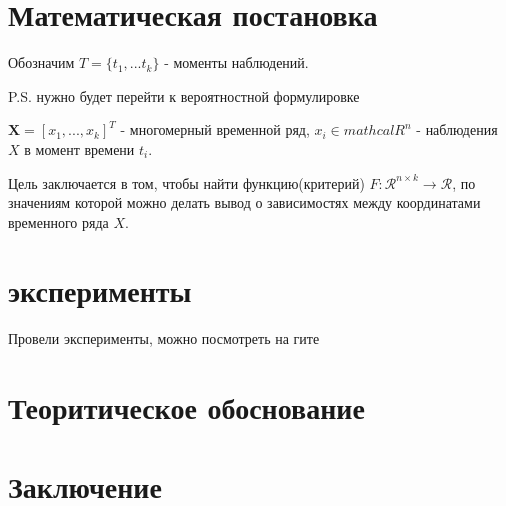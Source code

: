 \documentclass[12pt, twoside]{article}
\begin{document}
	
\newpage

	
\section{Математическая постановка}
Обозначим $T = \{t_1, ... t_k\}$ - моменты наблюдений.

P.S. нужно будет перейти к вероятностной формулировке

$\mathbf{X} = [x_1, ... , x_k]^T$ - многомерный временной ряд, $x_i \in mathcal{R}^n$ - наблюдения $X$ в момент времени $t_i$.

Цель заключается в том, чтобы найти функцию(критерий) $F: \mathcal{R}^{n \times k } \rightarrow \mathcal R$, по значениям которой можно делать вывод о зависимостях между координатами временного ряда $X$.
\section{эксперименты}
	Провели эксперименты, можно посмотреть на гите
	
\section{Теоритическое обоснование}
	
\section{Заключение}



	
	
\end{document}
